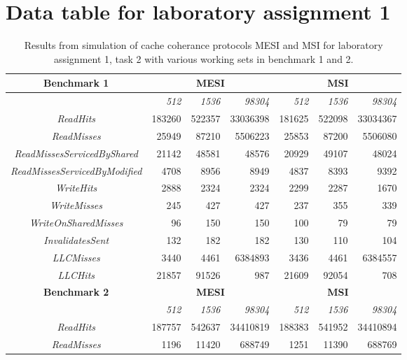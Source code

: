 \section{Data table for laboratory assignment 1}
\begin{table}[h]
	\caption{\label{tbl:lab1:task2}Results from simulation of cache coherance protocols MESI and MSI for laboratory assignment 1, task 2 with various working sets in benchmark 1 and 2.}
    \begin{adjustwidth}{-2cm}{-2cm}  
        \begin{center}

			\begin{tabular}{| c | r r r | r r r|}
				\textbf{Benchmark 1}& \multicolumn{3}{c|}{\textbf{MESI}} & \multicolumn{3}{c|}{\textbf{MSI}} \\
				\hline
				&\textit{512}&\textit{1536}&\textit{98304}&\textit{512}&\textit{1536}&\textit{98304}\\
				\hline
				\textit{ReadHits} & 183260 & 522357 & 33036398 & 181625 & 522098 & 33034367 \\
				\textit{ReadMisses} & 25949 & 87210 & 5506223 & 25853 & 87200 & 5506080\\ 
				\textit{ReadMissesServicedByShared} & 21142 & 48581 & 48576 & 20929 & 49107 & 48024 \\ 
				\textit{ReadMissesServicedByModified} & 4708 & 8956 & 8949 & 4837 & 8393 & 9392\\ 
				\textit{WriteHits} & 2888 & 2324 & 2324 & 2299 & 2287 & 1670 \\ 
				\textit{WriteMisses} & 245 & 427 & 427 & 237 & 355 & 339 \\ 
				\textit{WriteOnSharedMisses} & 96 & 150 & 150 & 100 & 79 & 79 \\ 
				\textit{InvalidatesSent} & 132 & 182 & 182 & 130 & 110 & 104 \\ 
				\textit{LLCMisses} & 3440 & 4461 & 6384893 & 3436 & 4461 & 6384557 \\ 
				\textit{LLCHits} & 21857 & 91526 & 987 & 21609 & 92054 & 708 \\
				\hline
			\textbf{Benchmark 2}& \multicolumn{3}{c|}{\textbf{MESI}} & \multicolumn{3}{c|}{\textbf{MSI}} \\
				\hline
				&\textit{512}&\textit{1536}&\textit{98304}&\textit{512}&\textit{1536}&\textit{98304}\\
				\hline
				\textit{ReadHits} & 187757 & 542637 & 34410819 & 188383 & 541952 & 34410894 \\
				\textit{ReadMisses} & 1196 & 11420 & 688749 & 1251 & 11390 & 688769 \\

\end{tabular}
\end{center}
\end{adjustwidth}
\end{table}
